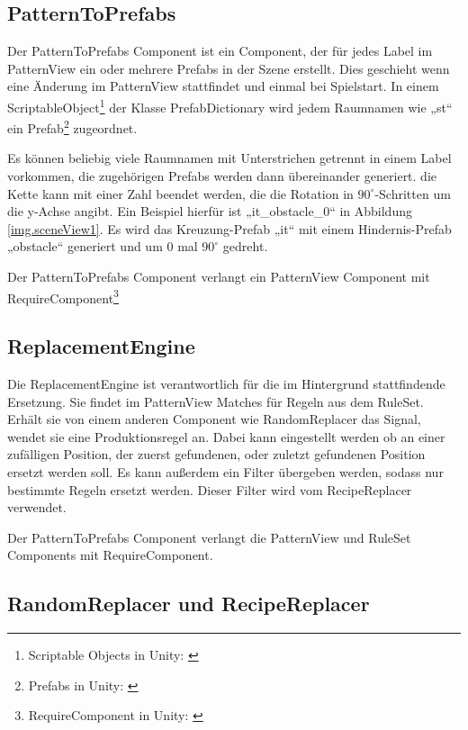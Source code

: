 
\subsection{PatternToPrefabs}

Der PatternToPrefabs Component ist ein Component, der für jedes Label im PatternView ein oder mehrere Prefabs in der Szene erstellt. Dies geschieht wenn eine Änderung im PatternView stattfindet und einmal bei Spielstart. In einem ScriptableObject\footnote{Scriptable Objects in Unity: \cite[Seite: class-ScriptableObject]{unityManual}} der Klasse PrefabDictionary wird jedem Raumnamen wie „st“ ein Prefab\footnote{Prefabs in Unity: \cite[Seite: LearningtheInterface]{unityManual}} zugeordnet. 

Es können beliebig viele Raumnamen mit Unterstrichen getrennt in einem Label vorkommen, die zugehörigen Prefabs werden dann übereinander generiert. die Kette kann mit einer Zahl beendet werden, die die Rotation in $90^\circ$-Schritten um die y-Achse angibt. Ein Beispiel hierfür ist „it\_obstacle\_0“ in Abbildung \ref{img.sceneView1}. Es wird das Kreuzung-Prefab „it“ mit einem Hindernis-Prefab „obstacle“ generiert und um 0 mal $90^\circ$ gedreht.

Der PatternToPrefabs Component verlangt ein PatternView Component mit RequireComponent\footnote{RequireComponent in Unity: \cite[Seite: RequireComponent]{unitySciptingReference}}

\subsection{ReplacementEngine}

Die ReplacementEngine ist verantwortlich für die im Hintergrund stattfindende Ersetzung. Sie findet im PatternView Matches für Regeln aus dem RuleSet. Erhält sie von einem anderen Component wie RandomReplacer das Signal, wendet sie eine Produktionsregel an. Dabei kann eingestellt werden ob an einer zufälligen Position, der zuerst gefundenen, oder zuletzt gefundenen Position ersetzt werden soll. Es kann außerdem ein Filter übergeben werden, sodass nur bestimmte Regeln ersetzt werden. Dieser Filter wird vom RecipeReplacer verwendet.

Der PatternToPrefabs Component verlangt die PatternView und RuleSet Components mit RequireComponent.

\subsection{RandomReplacer und RecipeReplacer}\label{ss.replacers}

